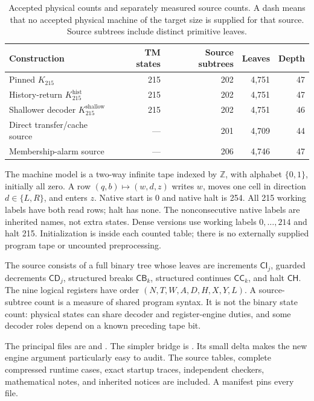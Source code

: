 \documentclass[11pt]{article}
\theoremstyle{definition}
\newcommand{\Kbase}{K_{215}}
\newcommand{\Kctx}{K_{215}^{\mathrm{hist}}}
\newcommand{\Ksh}{K_{215}^{\mathrm{shallow}}}
\begin{document}
\begin{table}[ht]
\centering\small
\begin{tabular}{@{}lrrrr@{}}
\toprule
Construction & TM states & Source subtrees & Leaves & Depth\\
\midrule
Pinned \(\Kbase\) & 215 & 202 & 4,751 & 47\\
History-return \(\Kctx\) & 215 & 202 & 4,751 & 47\\
Shallower decoder \(\Ksh\) & 215 & 202 & 4,751 & 46\\
Direct transfer/cache source & --- & 201 & 4,709 & 44\\
Membership-alarm source & --- & 206 & 4,746 & 47\\
\bottomrule
\end{tabular}
\caption{Accepted physical counts and separately measured source counts.
A dash means that no accepted physical machine of the target size is supplied
for that source. Source subtrees include distinct primitive leaves.}
\end{table}

The machine model is a two-way infinite tape indexed by \(\mathbb Z\), with
alphabet \(\{0,1\}\), initially all zero. A row \((q,b)\mapsto(w,d,z)\)
writes \(w\), moves one cell in direction \(d\in\{L,R\}\), and enters
\(z\). Native start is 0 and native halt is 254. All 215 working labels
have both read rows; halt has none. The nonconsecutive native labels are
inherited names, not extra states. Dense versions use working labels
\(0,\ldots,214\) and halt 215. Initialization is inside each counted table;
there is no externally supplied program tape or uncounted preprocessing.

The source consists of a full binary tree whose leaves are increments
\(\mathsf{CI}_j\), guarded decrements \(\mathsf{CD}_j\), structured breaks
\(\mathsf{CB}_k\), structured continues \(\mathsf{CC}_k\), and halt
\(\mathsf{CH}\). The nine logical registers have order
\((N,T,W,A,D,H,X,Y,L)\). A source-subtree count is a measure of shared
program syntax. It is not the binary state count: physical states can share
decoder and register-engine duties, and some decoder roles depend on a
known preceding tape bit.

The principal files are  and
. The simpler bridge is
. Its small delta makes the new engine
argument particularly easy to audit. The source tables, complete compressed
runtime cases, exact startup traces, independent checkers, mathematical
notes, and inherited notices are included. A manifest pins every file.
\end{document}
